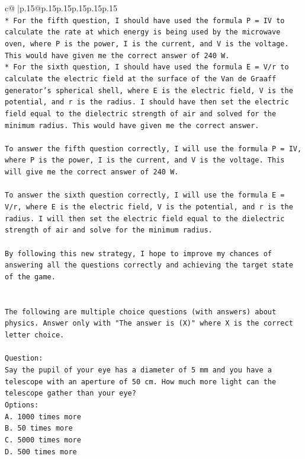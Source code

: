 \documentclass{article}
\begin{document}
{\begin{supertabular}{c@{$\;$}|p{.15\linewidth}@{}p{.15\linewidth}p{.15\linewidth}p{.15\linewidth}p{.15\linewidth}p{.15\linewidth}}
{{{\\ 
\texttt{* For the fifth question, I should have used the formula P = IV to calculate the rate at which energy is being used by the microwave oven, where P is the power, I is the current, and V is the voltage. This would have given me the correct answer of 240 W.} \\
\texttt{* For the sixth question, I should have used the formula E = V/r to calculate the electric field at the surface of the Van de Graaff generator's spherical shell, where E is the electric field, V is the potential, and r is the radius. I should have then set the electric field equal to the dielectric strength of air and solved for the minimum radius. This would have given me the correct answer.} \\
\\ 
\texttt{To answer the fifth question correctly, I will use the formula P = IV, where P is the power, I is the current, and V is the voltage. This will give me the correct answer of 240 W.} \\
\\ 
\texttt{To answer the sixth question correctly, I will use the formula E = V/r, where E is the electric field, V is the potential, and r is the radius. I will then set the electric field equal to the dielectric strength of air and solve for the minimum radius.} \\
\\ 
\texttt{By following this new strategy, I hope to improve my chances of answering all the questions correctly and achieving the target state of the game.} \\
\\ 
\\ 
\texttt{The following are multiple choice questions (with answers) about physics. Answer only with "The answer is (X)" where X is the correct letter choice.} \\
\\ 
\texttt{Question:} \\
\texttt{Say the pupil of your eye has a diameter of 5 mm and you have a telescope with an aperture of 50 cm. How much more light can the telescope gather than your eye?} \\
\texttt{Options:} \\
\texttt{A. 1000 times more} \\
\texttt{B. 50 times more} \\
\texttt{C. 5000 times more} \\
\texttt{D. 500 times more} \\
}}}
\end{supertabular}}
\end{document}
